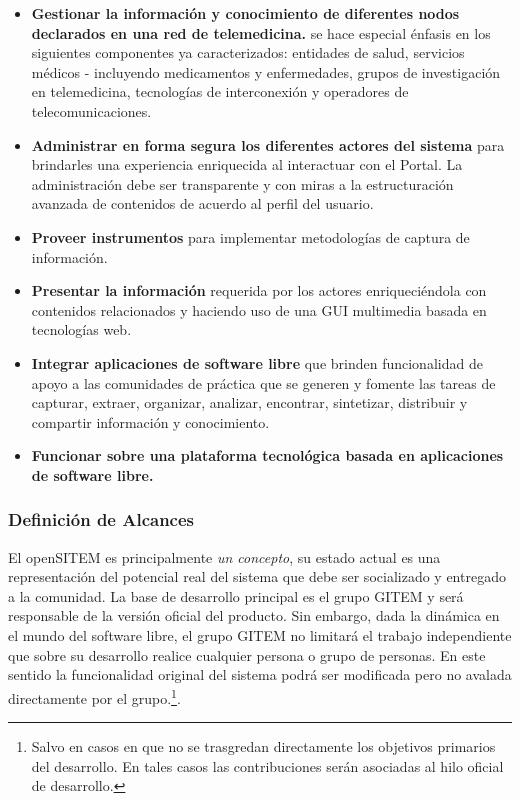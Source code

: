 \begin{itemize}
\item \textbf{Gestionar la información y conocimiento de diferentes nodos declarados en una red de telemedicina.} se hace especial énfasis en los siguientes componentes ya caracterizados: entidades de salud, servicios médicos - incluyendo medicamentos y enfermedades, grupos de investigación en telemedicina, tecnologías de interconexión y operadores de telecomunicaciones.

\item \textbf{Administrar en forma segura los diferentes actores del sistema} para brindarles una experiencia enriquecida al interactuar con el Portal. La administración debe ser transparente y con miras a la estructuración avanzada de contenidos de acuerdo al perfil del usuario.

\item \textbf{Proveer instrumentos} para implementar metodologías de captura de información.

\item \textbf{Presentar la información} requerida por los actores enriqueciéndola con contenidos relacionados y haciendo uso de una GUI multimedia basada en tecnologías web.

\item \textbf{Integrar aplicaciones de software libre} que brinden funcionalidad de apoyo a las comunidades de práctica que se generen y fomente las tareas de capturar, extraer, organizar, analizar, encontrar, sintetizar, distribuir y compartir información y conocimiento. 

\item \textbf{Funcionar sobre una plataforma tecnológica basada en aplicaciones de software libre.}

\end{itemize}


\subsubsection{Definición de Alcances}

El openSITEM es principalmente \textit{un concepto}, su estado actual es una representación del potencial real del sistema que debe ser socializado y entregado a la comunidad. La base de desarrollo principal es el grupo GITEM y será responsable de la versión oficial del producto. Sin embargo, dada la dinámica en el mundo del software libre, el grupo GITEM no limitará el trabajo independiente que sobre su desarrollo realice cualquier persona o grupo de personas. En este sentido la funcionalidad original del sistema podrá ser modificada pero no avalada directamente por el grupo.\footnote{Salvo en casos en que no se trasgredan directamente los objetivos primarios del desarrollo. En tales casos las contribuciones serán asociadas al hilo oficial de desarrollo.}. 

